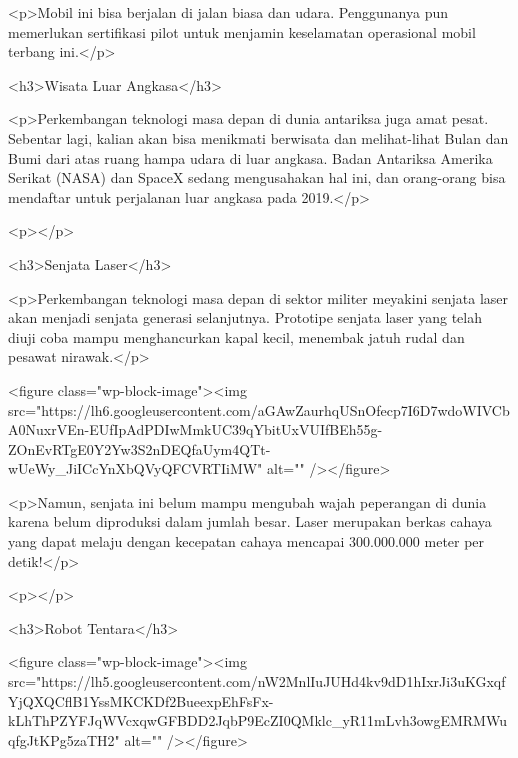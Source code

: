 <p>Mobil ini bisa berjalan di jalan biasa dan udara. Penggunanya pun memerlukan sertifikasi pilot untuk menjamin keselamatan operasional mobil terbang ini.</p>



<h3>Wisata Luar Angkasa</h3>



<p>Perkembangan teknologi masa depan di dunia antariksa juga amat pesat. Sebentar lagi, kalian akan bisa menikmati berwisata dan melihat-lihat Bulan dan Bumi dari atas ruang hampa udara di luar angkasa. Badan Antariksa Amerika Serikat (NASA) dan SpaceX sedang mengusahakan hal ini, dan orang-orang bisa mendaftar untuk perjalanan luar angkasa pada 2019.</p>



<p></p>



<h3>Senjata Laser</h3>



<p>Perkembangan teknologi masa depan di sektor militer meyakini senjata laser akan menjadi senjata generasi selanjutnya. Prototipe senjata laser yang telah diuji coba mampu menghancurkan kapal kecil, menembak jatuh rudal dan pesawat nirawak.</p>



<figure class="wp-block-image"><img src="https://lh6.googleusercontent.com/aGAwZaurhqUSnOfecp7I6D7wdoWIVCbA0NuxrVEn-EUfIpAdPDIwMmkUC39qYbitUxVUIfBEh55g-ZOnEvRTgE0Y2Yw3S2nDEQfaUym4QTt-wUeWy_JiICcYnXbQVyQFCVRTIiMW" alt="" /></figure>



<p>Namun, senjata ini belum mampu mengubah wajah peperangan di dunia karena belum diproduksi dalam jumlah besar. Laser merupakan berkas cahaya yang dapat melaju dengan kecepatan cahaya mencapai 300.000.000 meter per detik!</p>



<p></p>



<h3>Robot Tentara</h3>



<figure class="wp-block-image"><img src="https://lh5.googleusercontent.com/nW2MnlIuJUHd4kv9dD1hIxrJi3uKGxqfYjQXQCflB1YssMKCKDf2BueexpEhFsFx-kLhThPZYFJqWVcxqwGFBDD2JqbP9EcZI0QMklc_yR11mLvh3owgEMRMWuqfgJtKPg5zaTH2" alt="" /></figure>



